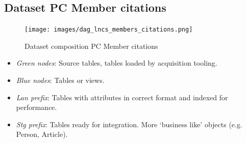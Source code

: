 \documentclass{ou-report}
\begin{document}
\begin{landscape}

\chapter{Dataset PC Member citations}
\label{appendix:dataset_pcmember_citation}

\begin{figure}[H]
    \centering
    \texttt{[image: images/dag\_lncs\_members\_citations.png]}
    \caption{Dataset composition PC Member citations}
    \label{fig:dataset_pc_member_citation}
\end{figure}

\begin{itemize}
    \item \emph{Green nodes}: Source tables, tables loaded by acquisition
        tooling.
    \item \emph{Blue nodes}: Tables or views.
    \item \emph{Lan prefix}: Tables with attributes in correct format and indexed
        for performance.
    \item \emph{Stg prefix}: Tables ready for integration. More `business like'
        objects (e.g. Person, Article).
\end{itemize}



\end{landscape}
\end{document}
